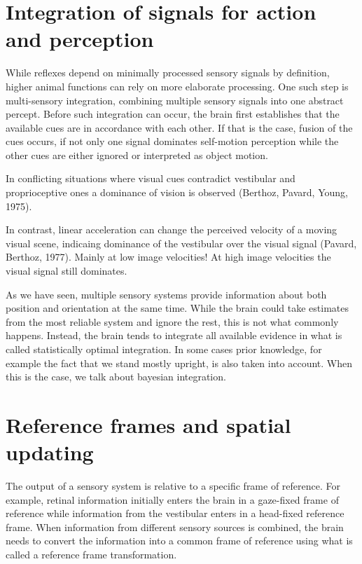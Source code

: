 

\section{Integration of signals for action and perception}
While reflexes depend on minimally processed sensory signals by definition, higher animal functions can rely on more elaborate processing. One such step is multi-sensory integration, combining multiple sensory signals into one abstract percept. Before such integration can occur, the brain first establishes that the available cues are in accordance with each other. If that is the case, fusion of the cues occurs, if not only one signal dominates self-motion perception while the other cues are either ignored or interpreted as object motion.

In conflicting situations where visual cues contradict vestibular and proprioceptive ones a dominance of vision is observed (Berthoz, Pavard, Young, 1975).

In contrast, linear acceleration can change the perceived velocity of a moving visual scene, indicaing dominance of the vestibular over the visual signal (Pavard, Berthoz, 1977). Mainly at low image velocities! At high image velocities the visual signal still dominates.

As we have seen, multiple sensory systems provide information about both position and orientation at the same time. While the brain could take estimates from the most reliable system and ignore the rest, this is not what commonly happens.
Instead, the brain tends to integrate all available evidence in what is called statistically optimal integration. In some cases prior knowledge, for example the fact that we stand mostly upright, is also taken into account. When this is the case, we talk about bayesian integration.


\section{Reference frames and spatial updating}
The output of a sensory system is relative to a specific frame of reference. For example, retinal information initially enters the brain in a gaze-fixed frame of reference while information from the vestibular enters in a head-fixed reference frame. When information from different sensory sources is combined, the brain needs to convert the information into a common frame of reference using what is called a reference frame transformation.

